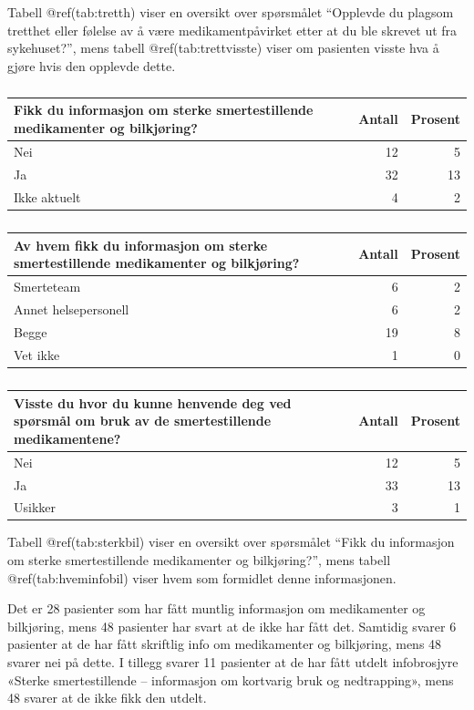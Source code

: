 \documentclass[
]{article}
\begin{document}
Tabell @ref(tab:tretth) viser en oversikt over spørsmålet ``Opplevde du
plagsom tretthet eller følelse av å være medikamentpåvirket etter at du
ble skrevet ut fra sykehuset?'', mens tabell @ref(tab:trettvisste) viser
om pasienten visste hva å gjøre hvis den opplevde dette.

\begin{table}

\caption{\label{tab:sterkbil}}
\centering
\begin{tabular}[t]{l|r|r}
\hline
Fikk du informasjon om sterke smertestillende medikamenter og bilkjøring? & Antall  & Prosent\\
\hline
Nei & 12 & 5\\
\hline
Ja & 32 & 13\\
\hline
Ikke aktuelt & 4 & 2\\
\hline
\end{tabular}
\end{table}

\begin{table}

\caption{\label{tab:hveminfobil}}
\centering
\begin{tabular}[t]{l|r|r}
\hline
Av hvem fikk du informasjon om sterke smertestillende medikamenter og bilkjøring? & Antall  & Prosent\\
\hline
Smerteteam & 6 & 2\\
\hline
Annet helsepersonell & 6 & 2\\
\hline
Begge & 19 & 8\\
\hline
Vet ikke & 1 & 0\\
\hline
\end{tabular}
\end{table}

\begin{table}

\caption{\label{tab:bil}}
\centering
\begin{tabular}[t]{l|r|r}
\hline
Visste du hvor du kunne henvende deg ved spørsmål om bruk av de smertestillende medikamentene? & Antall  & Prosent\\
\hline
Nei & 12 & 5\\
\hline
Ja & 33 & 13\\
\hline
Usikker & 3 & 1\\
\hline
\end{tabular}
\end{table}

Tabell @ref(tab:sterkbil) viser en oversikt over spørsmålet ``Fikk du
informasjon om sterke smertestillende medikamenter og bilkjøring?'',
mens tabell @ref(tab:hveminfobil) viser hvem som formidlet denne
informasjonen.

Det er 28 pasienter som har fått muntlig informasjon om medikamenter og
bilkjøring, mens 48 pasienter har svart at de ikke har fått det.
Samtidig svarer 6 pasienter at de har fått skriftlig info om
medikamenter og bilkjøring, mens 48 svarer nei på dette. I tillegg
svarer 11 pasienter at de har fått utdelt infobrosjyre «Sterke
smertestillende -- informasjon om kortvarig bruk og nedtrapping», mens
48 svarer at de ikke fikk den utdelt.
\end{document}
